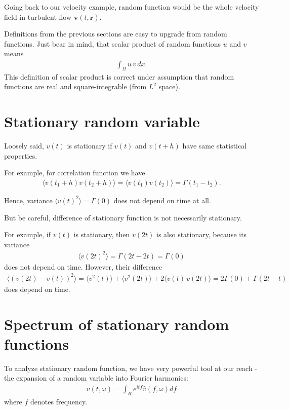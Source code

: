 Going back to our velocity example, random function would be the whole velocity field in turbulent flow
$\bm{v}(t,\bm{r})$.

\bigskip

Definitions from the previous sections are easy to upgrade from random functions.
Just bear in mind, that scalar product of random functions $u$ and $v$ means
\begin{align}
\int_{\Omega} u \, v \, dx.
\end{align}
This definition of scalar product is correct under assumption that random functions are real and square-integrable (from $L^2$ space).


\section{Stationary random variable}
Loosely said, $v(t)$ is stationary if $v(t)$ and $v(t+h)$ have same statistical properties.

For example, for correlation function we have
\begin{align}
\langle v(t_1+h) v(t_2 + h) \rangle = \langle v(t_1) v(t_2) \rangle = \Gamma(t_1 - t_2).
\end{align}

Hence, variance $\langle v(t)^2 \rangle = \Gamma(0)$ does not depend on time at all.

But be careful, difference of stationary function is not necessarily stationary. 

For example, if $v(t)$ is stationary, then $v(2t)$ is also stationary, because its variance
\begin{align}
\langle v(2t)^2 \rangle = \Gamma(2t - 2t) = \Gamma(0)
\end{align}
does not depend on time.
However, their difference
\begin{align}
\langle (v(2t) - v(t))^2 \rangle = \langle v^2(t) \rangle + \langle v^2(2t) \rangle + 2\langle v(t)\,v(2t) \rangle = 2\Gamma(0) + \Gamma(2t - t)
\end{align} 
does depend on time.

\section{Spectrum of stationary random functions}

To analyze stationary random function, we have very powerful tool at our reach - the expansion of a random variable into Fourier harmonics:
\begin{align}
v(t,\omega) = \int_{R} e^{itf} \hat{v}(f,\omega) df
\end{align}
where $f$ denotes frequency.

